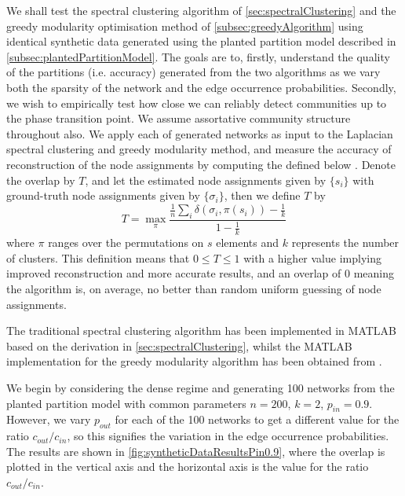 We shall test the spectral clustering algorithm of \cref{sec:spectralClustering} and the greedy modularity optimisation method of \cref{subsec:greedyAlgorithm} using identical synthetic data generated using the planted partition model described in \cref{subsec:plantedPartitionModel}.
The goals are to, firstly, understand the quality of the partitions (i.e. accuracy) generated from the two algorithms as we vary both the sparsity of the network and the edge occurrence probabilities.
Secondly, we wish to empirically test how close we can reliably detect communities up to the phase transition point.
We assume assortative community structure throughout also.
We apply each of generated networks as input to the Laplacian spectral clustering and greedy modularity method, and measure the accuracy of reconstruction of the node assignments by computing the  defined below \cite{DKM+11}.
Denote the overlap by $T$, and let the estimated node assignments given by $\{s_{i}\}$ with ground-truth node assignments given by $\{\sigma_{i}\}$, then we define $T$ by
\begin{equation}
	\label{eq:overlap}
	T = \max_{\pi} \frac{\frac{1}{n} \sum_{i} \delta(\sigma_{i},\pi(s_{i})) - \frac{1}{k}}{1 - \frac{1}{k}}
\end{equation}
where $\pi$ ranges over the permutations on $s$ elements and $k$ represents the number of clusters.
This definition means that $0 \le T \le 1$ with a higher value implying improved reconstruction and more accurate results, and an overlap of 0 meaning the algorithm is, on average, no better than random uniform guessing of node assignments.

The traditional spectral clustering algorithm  has been implemented in MATLAB based on the derivation in \cref{sec:spectralClustering}, whilst the MATLAB implementation for the greedy modularity algorithm has been obtained from \cite{ELM}.

We begin by considering the dense regime and generating 100 networks from the planted partition model with common parameters $n=200$, $k=2$, $p_{in}=0.9$.
However, we vary $p_{out}$ for each of the 100 networks to get a different value for the ratio $c_{out}/c_{in}$, so this signifies the variation in the edge occurrence probabilities.
The results are shown in \cref{fig:syntheticDataResultsPin0.9}, where the overlap is plotted in the vertical axis and the horizontal axis is the value for the ratio $c_{out}/c_{in}$.

